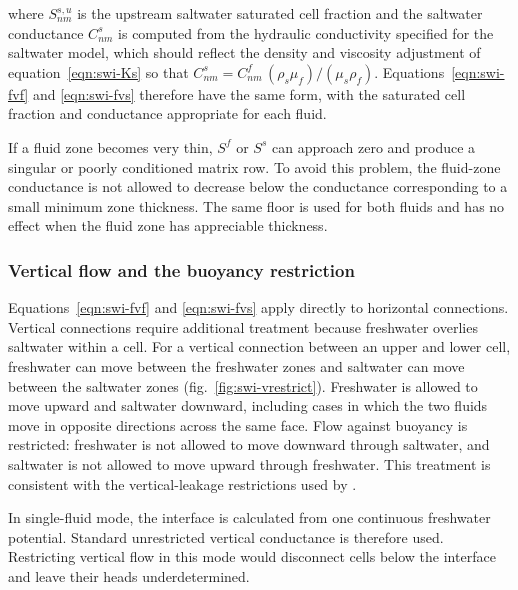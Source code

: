 \noindent where $S_{nm}^{s,u}$ is the upstream saltwater saturated cell fraction and the saltwater conductance $C_{nm}^{s}$ is computed from the hydraulic conductivity specified for the saltwater model, which should reflect the density and viscosity adjustment of equation~\ref{eqn:swi-Ks} so that $C_{nm}^{s}=C_{nm}^{f}\,(\rho_{s}\mu_{f})/(\mu_{s}\rho_{f})$. Equations~\ref{eqn:swi-fvf} and \ref{eqn:swi-fvs} therefore have the same form, with the saturated cell fraction and conductance appropriate for each fluid.

If a fluid zone becomes very thin, $S^{f}$ or $S^{s}$ can approach zero and produce a singular or poorly conditioned matrix row. To avoid this problem, the fluid-zone conductance is not allowed to decrease below the conductance corresponding to a small minimum zone thickness. The same floor is used for both fluids and has no effect when the fluid zone has appreciable thickness.

\subsubsection{Vertical flow and the buoyancy restriction}
\label{sec:swi-vflow}

Equations~\ref{eqn:swi-fvf} and \ref{eqn:swi-fvs} apply directly to horizontal connections. Vertical connections require additional treatment because freshwater overlies saltwater within a cell. For a vertical connection between an upper and lower cell, freshwater can move between the freshwater zones and saltwater can move between the saltwater zones (fig.~\ref{fig:swi-vrestrict}). Freshwater is allowed to move upward and saltwater downward, including cases in which the two fluids move in opposite directions across the same face. Flow against buoyancy is restricted: freshwater is not allowed to move downward through saltwater, and saltwater is not allowed to move upward through freshwater. This treatment is consistent with the vertical-leakage restrictions used by \citet{huyakorn1996multiphase}.

In single-fluid mode, the interface is calculated from one continuous freshwater potential. Standard unrestricted vertical conductance is therefore used. Restricting vertical flow in this mode would disconnect cells below the interface and leave their heads underdetermined.

